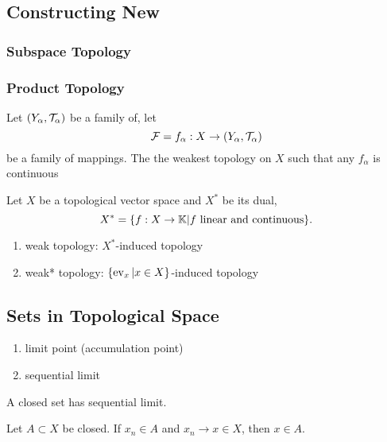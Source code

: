\subsection{Constructing New }

\subsubsection{Subspace Topology}

\subsubsection{Product Topology}

\begin{definition}
    Let $(Y_\alpha,\mathcal{T}_\alpha)$ be a family of,
    let 
    $$
    \mathcal{F}={f_\alpha:X\to (Y_\alpha,\mathcal{T}_\alpha)}
    $$
    be a family of mappings.
    The the weakest topology on $X$ such that any $f_\alpha$ is continuous
\end{definition}

\begin{example}
    Let $X$ be a topological vector space and $X^*$ be its dual,
    $$X^*=\{f:X\to\mathbb{K}|f\text{ linear and continuous}\}.$$
    \begin{enumerate}[label=(\roman*)]
        \item weak topology: $X^*$-induced topology
        \item weak* topology: $\{\operatorname{ev}_x|x\in X\}$-induced topology
    \end{enumerate}
\end{example}


\subsection{Sets in Topological Space}





\begin{definition}
    \begin{enumerate}[label=(\roman*)]
        \item limit point (accumulation point)
        \item sequential limit
    \end{enumerate}
\end{definition}

A closed set has sequential limit.
\begin{theorem}
    Let $A\subset X$ be closed. If $x_n\in A$ and $x_n\to x\in X$, then $x\in A$.
\end{theorem}

